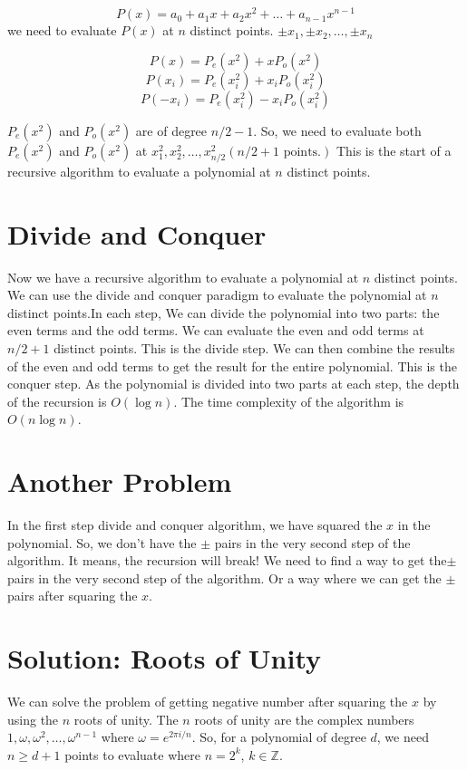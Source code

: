 \documentclass[28]{report}
\begin{document}
$$	P(x) = a_0 + a_1x + a_2x^2 + \ldots + a_{n-1}x^{n-1} $$
we need to evaluate \(P(x)\) at \(n\) distinct points. $\pm x_1,\pm x_2, \ldots, \pm x_n $

$$ P(x) = P_e(x^2) + xP_o(x^2)$$
$$ P(x_i) = P_e(x_i^2) + x_iP_o(x_i^2)$$
 $$P(-x_i) = P_e(x_i^2) - x_iP_o(x_i^2)$$

\(P_e(x^2)\) and \(P_o(x^2)\) are of degree \(n/2-1\).\newline
So, we need to evaluate both \(P_e(x^2)\) and \(P_o(x^2)\) at $ x_1^2, x_2^2, \ldots, x_{n/2}^2 (n/2 + 1 \text{ points.})$ \newline
This is the start of a recursive algorithm to evaluate a polynomial at \(n\) distinct points.

\section{Divide and Conquer}
Now we have a recursive algorithm to evaluate a polynomial at \(n\) distinct points. We can use the divide and conquer paradigm to evaluate the polynomial at \(n\) distinct points.In each step, We can divide the polynomial into two parts: the even terms and the odd terms. We can evaluate the even and odd terms at \(n/2 + 1\) distinct points. This is the divide step. We can then combine the results of the even and odd terms to get the result for the entire polynomial. This is the conquer step. As the polynomial is divided into two parts at each step, the depth of the recursion is \(O(\log n)\). The time complexity of the algorithm is \(O(n \log n)\).

\section{Another Problem}
In the first step divide and conquer algorithm, we have squared the $x$ in the polynomial. So, we don't have the $\pm$ pairs in the very second step of the algorithm. It means, the recursion will break! We need to find a way to get the$ \pm $ pairs in the very second step of the algorithm. Or a way where we can get the $\pm $pairs after squaring the \(x\).

\section{Solution: Roots of Unity}
We can solve the problem of getting negative number after squaring the \(x\) by using the \(n\) roots of unity. The \(n\) roots of unity are the complex numbers \(1, \omega, \omega^2, \ldots, \omega^{n-1}\) where \(\omega = e^{2\pi i/n}\). 
So, for a polynomial of degree \(d\), we need \(n \geq d + 1\) points to evaluate where \(n = 2^k\), \(k \in \mathbb{Z}\).
\end{document}
